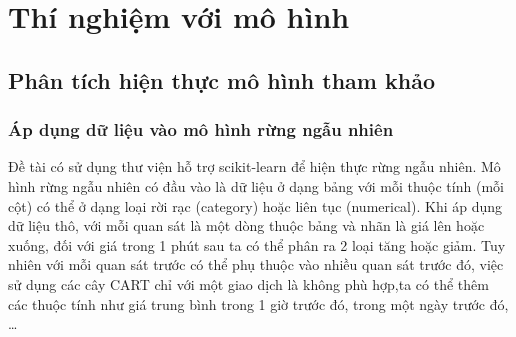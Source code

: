 \chapter{Thí nghiệm với mô hình} \label{chap-Summary}

\section{Phân tích hiện thực mô hình tham khảo}

\subsection{Áp dụng dữ liệu vào mô hình rừng ngẫu nhiên}
 Đề tài có sử dụng thư viện hỗ trợ scikit-learn để hiện thực rừng ngẫu nhiên.
 Mô hình rừng ngẫu nhiên có đầu vào là dữ liệu ở dạng bảng với mỗi thuộc tính (mỗi cột) có thể ở dạng loại rời rạc (category) hoặc liên tục (numerical). Khi áp dụng dữ liệu thô, với mỗi quan sát là một dòng thuộc bảng và nhãn là giá lên hoặc xuống, đối với giá trong 1 phút sau ta có thể phân ra 2 loại tăng hoặc giảm. Tuy nhiên với mỗi quan sát trước có thể phụ thuộc vào nhiều quan sát trước đó, việc sử dụng các cây CART chỉ với một giao dịch là không phù hợp,ta có thể thêm các thuộc tính như giá trung bình trong 1 giờ trước đó, trong một ngày trước đó, \dots
 
